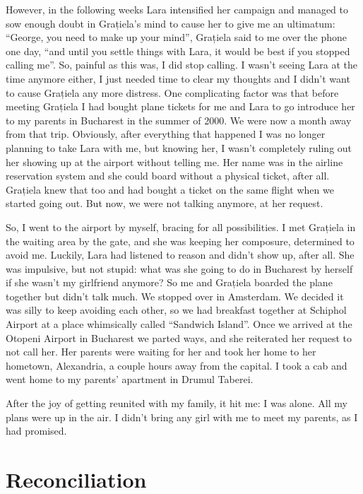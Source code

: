 \documentclass[12pt]{book}
\begin{document}
However, in the following weeks Lara intensified her campaign and
managed to sow enough doubt in Grațiela's mind to cause her to give me
an ultimatum: ``George, you need to make up your mind'', Grațiela said
to me over the phone one day, ``and until you settle things with Lara,
it would be best if you stopped calling me''. So, painful as this was, I
did stop calling. I wasn't seeing Lara at the time anymore either, I
just needed time to clear my thoughts and I didn't want to cause
Grațiela any more distress. One complicating factor was that before
meeting Grațiela I had bought plane tickets for me and Lara to go
introduce her to my parents in Bucharest in the summer of 2000. We were
now a month away from that trip. Obviously, after everything that
happened I was no longer planning to take Lara with me, but knowing her,
I wasn't completely ruling out her showing up at the airport without
telling me. Her name was in the airline reservation system and she could
board without a physical ticket, after all. Grațiela knew that too and
had bought a ticket on the same flight when we started going out. But
now, we were not talking anymore, at her request.

So, I went to the airport by myself, bracing for all possibilities. I
met Grațiela in the waiting area by the gate, and she was keeping her
composure, determined to avoid me. Luckily, Lara had listened to reason
and didn't show up, after all. She was impulsive, but not stupid: what
was she going to do in Bucharest by herself if she wasn't my girlfriend
anymore? So me and Grațiela boarded the plane together but didn't talk
much. We stopped over in Amsterdam. We decided it was silly to keep
avoiding each other, so we had breakfast together at Schiphol Airport at
a place whimsically called ``Sandwich Island''. Once we arrived at the
Otopeni Airport in Bucharest we parted ways, and she reiterated her
request to not call her. Her parents were waiting for her and took her
home to her hometown, Alexandria, a couple hours away from the capital.
I took a cab and went home to my parents' apartment in Drumul Taberei.

After the joy of getting reunited with my family, it hit me: I was
alone. All my plans were up in the air. I didn't bring any girl with me
to meet my parents, as I had promised.


\section{Reconciliation}
\end{document}
